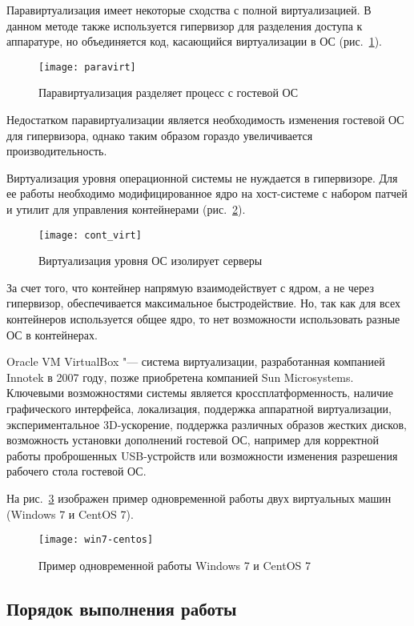 Паравиртуализация имеет некоторые сходства с полной виртуализацией.
В данном методе также используется гипервизор для разделения доступа к аппаратуре, но объединяется код, касающийся виртуализации в ОС (рис.~\ref{pic:paravirt}).
\begin{figure}[ht]
    \centering
	\texttt{[image: paravirt]}
	\caption{Паравиртуализация разделяет процесс с гостевой ОС}\label{pic:paravirt}
\end{figure}

Недостатком паравиртуализации является необходимость изменения гостевой ОС для гипервизора, однако таким образом гораздо увеличивается производительность.

Виртуализация уровня операционной системы не нуждается в гипервизоре.
Для ее работы необходимо модифицированное ядро на хост-системе с набором патчей и утилит для управления контейнерами (рис.~\ref{pic:cont_virt}).
\begin{figure}[ht]
    \centering
	\texttt{[image: cont\_virt]}
	\caption{Виртуализация уровня ОС изолирует серверы}\label{pic:cont_virt}
\end{figure}

За счет того, что контейнер напрямую взаимодействует с ядром, а не через гипервизор, обеспечивается максимальное быстродействие. Но, так как для всех контейнеров используется общее ядро, то нет возможности использовать разные ОС в контейнерах.

Oracle VM VirtualBox "--- система виртуализации, разработанная компанией Innotek в 2007 году, позже приобретена компанией Sun Microsystems.
Ключевыми возможностями системы является кроссплатформенность, наличие графического интерфейса, локализация, поддержка аппаратной виртуализации, экспериментальное 3D-ускорение, поддержка различных образов жестких дисков, возможность установки дополнений гостевой ОС, например для корректной работы проброшенных USB-устройств или возможности изменения разрешения рабочего стола гостевой ОС.

На рис.~\ref{pic:win7-centos} изображен пример одновременной работы двух виртуальных машин (Windows 7 и CentOS 7).
\begin{figure}[ht]
    \centering
	\texttt{[image: win7-centos]}
	\caption{Пример одновременной работы Windows 7 и CentOS 7}\label{pic:win7-centos}
\end{figure}

\subsection{Порядок выполнения работы}

